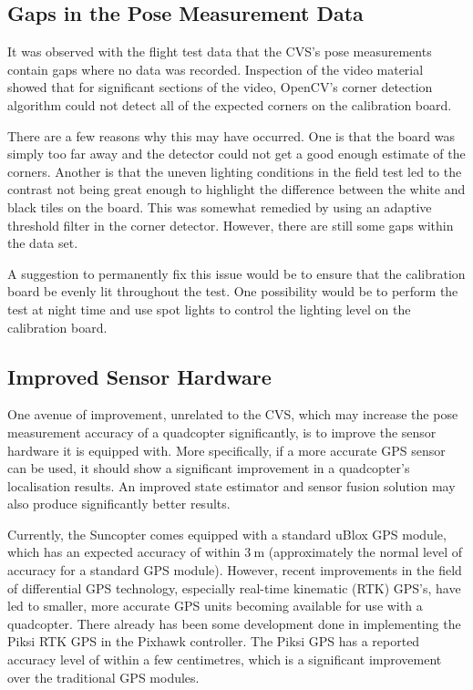 \subsection{Gaps in the Pose Measurement Data}

It was observed with the flight test data that the CVS's pose measurements contain gaps where no data was recorded. Inspection of the video material showed that for significant sections of the video, OpenCV's corner detection algorithm could not detect all of the expected corners on the calibration board. 

There are a few reasons why this may have occurred. One is that the board was simply too far away and the detector could not get a good enough estimate of the corners. Another is that the uneven lighting conditions in the field test led to the contrast not being great enough to highlight the difference between the white and black tiles on the board. This was somewhat remedied by using an adaptive threshold filter in the corner detector. However, there are still some gaps within the data set. 

A suggestion to permanently fix this issue would be to ensure that the calibration board be evenly lit throughout the test. One possibility would be to perform the test at night time and use spot lights to control the lighting level on the calibration board. 

\subsection{Improved Sensor Hardware}

One avenue of improvement, unrelated to the CVS, which may increase the pose measurement accuracy of a quadcopter significantly, is to improve the sensor hardware it is equipped with. More specifically, if a more accurate GPS sensor can be used, it should show a significant improvement in a quadcopter's localisation results. An improved state estimator and sensor fusion solution may also produce significantly better results. 

Currently, the Suncopter comes equipped with a standard uBlox GPS module, which has an expected accuracy of within $\SI{3}{\m}$ (approximately the normal level of accuracy for a standard GPS module). However, recent improvements in the field of differential GPS technology, especially real-time kinematic (RTK) GPS's, have led to smaller, more accurate GPS units becoming available for use with a quadcopter. There already has been some development done in implementing the Piksi RTK GPS in the Pixhawk controller. The Piksi GPS has a reported accuracy level of within a few centimetres, which is a significant improvement over the traditional GPS modules. 

